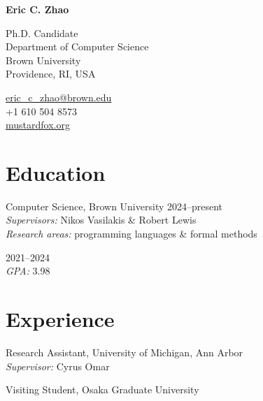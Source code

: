 \documentclass[11pt,letterpaper]{report} %
\newcommand{\myname}{Eric C. Zhao}
\newcommand{\namefont}[1]{{\normalfont\bfseries\Huge{#1}}}
\begin{document}
\raggedright{}

\namefont{\myname}

\vspace{1em}
\begin{minipage}[t]{0.700\textwidth}
  Ph.D. Candidate \\
  Department of Computer Science \\
  Brown University \\
  Providence, RI, USA
\end{minipage}
%
\begin{minipage}[t]{0.295\textwidth}
  \raggedleft{}
  \href{mailto:eric_c_zhao@brown.edu}{eric\_c\_zhao@brown.edu} \\
  +1 610 504 8573 \\
  \href{https://mustardfox.org}{mustardfox.org}
\end{minipage}

\section*{Education}
\begin{tablist}
  \item[Ph.D.]  \tab{}Computer Science, Brown University \hfill 2024--present \\
           \emph{Supervisors:} Nikos Vasilakis \& Robert Lewis \\
           \emph{Research areas:} programming languages \& formal methods

  \item[B.S.E.]  \hfill 2021--2024 \\
           \emph{GPA:} 3.98
\end{tablist}

\section*{Experience}
\begin{tablist}
  \item[2021--24] \tab{}Research Assistant, University of Michigan, Ann Arbor \\
                   \emph{Supervisor:} Cyrus Omar

  \item[2023]     \tab{}Visiting Student, Osaka Graduate University
\end{tablist}
\end{document}
